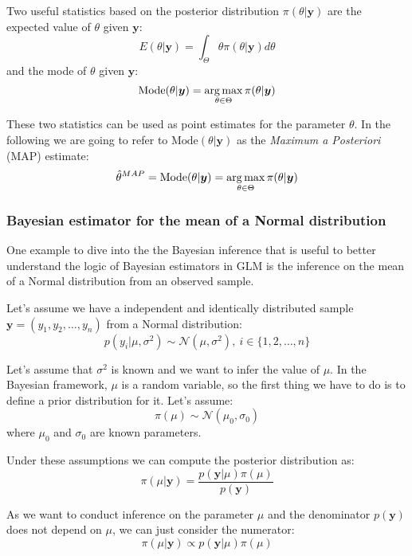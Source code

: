 \documentclass[a4paper, nobind]{templates/ociamthesis}
\theoremstyle{definition}
\theoremstyle{definition}
\theoremstyle{definition}
\theoremstyle{remark}
\begin{document}
Two useful statistics based on the posterior distribution \(\pi(\theta|\boldsymbol{y})\) are the expected value of \(\theta\) given \(\boldsymbol{y}\):
\[
E(\theta|\boldsymbol{y}) = \int_{\Theta}{\theta \pi(\theta|\boldsymbol{y}) d\theta}
\]
and the mode of \(\theta\) given \(\boldsymbol{y}\):
\[
\text{Mode}(\theta|\boldsymbol{y}) = \operatorname*{arg\,max}_{\theta\in\Theta}{\pi(\theta|\boldsymbol{y})}
\]

These two statistics can be used as point estimates for the parameter \(\theta\). In the following we are going to refer to \(\text{Mode}(\theta|\boldsymbol{y})\) as the \emph{Maximum a Posteriori} (MAP) estimate:
\[
\hat{\theta}^{MAP} = \text{Mode}(\theta|\boldsymbol{y}) = \operatorname*{arg\,max}_{\theta\in\Theta}{\pi(\theta|\boldsymbol{y})}
\]

\hypertarget{bayesian-estimator-for-the-mean-of-a-normal-distribution}{%
\subsubsection{Bayesian estimator for the mean of a Normal distribution}\label{bayesian-estimator-for-the-mean-of-a-normal-distribution}}

One example to dive into the the Bayesian inference that is useful to better understand the logic of Bayesian estimators in GLM is the inference on the mean of a Normal distribution from an observed sample.

Let's assume we have a independent and identically distributed sample \(\boldsymbol{y} = (y_1, y_2, \dots, y_n)\) from a Normal distribution:
\begin{equation}
\label{eq:bayes-normal-normal-likelihood}
p(y_i | \mu, \sigma^2) \sim \mathcal{N}(\mu, \sigma^2), \ i\in\{1,2,\dots,n\}
\end{equation}

Let's assume that \(\sigma^2\) is known and we want to infer the value of \(\mu\). In the Bayesian framework, \(\mu\) is a random variable, so the first thing we have to do is to define a prior distribution for it. Let's assume:
\begin{equation}
\label{eq:bayes-normal-normal-prior}
\pi(\mu) \sim \mathcal{N}(\mu_0, \sigma_0)
\end{equation}
where \(\mu_0\) and \(\sigma_0\) are known parameters.

Under these assumptions we can compute the posterior distribution as:
\[
\pi(\mu|\boldsymbol{y}) = \frac{p(\boldsymbol{y}|\mu)\pi(\mu)}{p(\boldsymbol{y})}
\]

As we want to conduct inference on the parameter \(\mu\) and the denominator \(p(\boldsymbol{y})\) does not depend on \(\mu\), we can just consider the numerator:
\begin{equation}
\label{eq:bayes-normal-normal-posterior-compute}
\pi(\mu|\boldsymbol{y}) \propto p(\boldsymbol{y}|\mu)\pi(\mu)
\end{equation}
\end{document}
